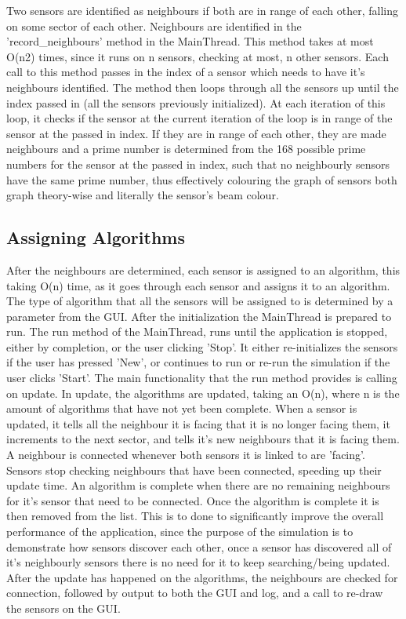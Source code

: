 Two sensors are identified as neighbours if both are in range of each other, falling on some 
sector of each other. Neighbours are identified in the 'record\_neighbours' method in the 
MainThread. This method takes at most O(n2) times, since it runs on n sensors, checking at 
most, n other sensors. Each call to this method passes in the index of a sensor which needs to 
have it's neighbours identified. The method then loops through all the sensors up until the 
index passed in (all the sensors previously initialized). At each iteration of this loop, it 
checks if the sensor at the current iteration of the loop is in range of the sensor at the 
passed in index. If they are in range of each other, they are made neighbours and a prime 
number is determined from the 168 possible prime numbers for the sensor at the passed in 
index, such that no neighbourly sensors have the same prime number, thus effectively colouring 
the graph of sensors both graph theory-wise and literally the sensor's beam colour. 

\subsection{Assigning Algorithms}

After the neighbours are determined, each sensor is assigned to an algorithm, this taking O(n) 
time, as it goes through each sensor and assigns it to an algorithm. The type of algorithm 
that all the sensors will be assigned to is determined by a parameter from the GUI. After the 
initialization the MainThread is prepared to run.  The run method of the MainThread, runs 
until the application is stopped, either by completion, or the user clicking 'Stop'. It either 
re-initializes the sensors if the user has pressed 'New', or continues to run or re-run the 
simulation if the user clicks 'Start'. The main functionality that the run method provides is 
calling on update. In update, the algorithms are updated, taking an O(n), where n is the 
amount of algorithms that have not yet been complete. When a sensor is updated, it tells all 
the neighbour it is facing that it is no longer facing them, it increments to the next sector, 
and tells it's new neighbours that it is facing them. A neighbour is connected whenever both 
sensors it is linked to are 'facing'. Sensors stop checking neighbours that have been 
connected, speeding up their update time. An algorithm is complete when there are no remaining 
neighbours for it's sensor that need to be connected. Once the algorithm is complete it is 
then removed from the list. This is to done to significantly improve the overall performance 
of the application, since the purpose of the simulation is to demonstrate how sensors discover 
each other, once a sensor has discovered all of it's neighbourly sensors there is no need for 
it to keep searching/being updated. After the update has happened on the algorithms, the 
neighbours are checked for connection, followed by output to both the GUI and log, and a call 
to re-draw the sensors on the GUI. 
	
